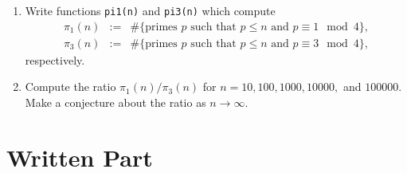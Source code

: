 \documentclass[11pt]{article}
\begin{document}
\begin{enumerate}
{\begin{enumerate}
{    }
    \item{
    Write functions \verb|pi1(n)| and \verb|pi3(n)| which compute
    \begin{eqnarray*}
      \pi_1(n)&:=&\#\{\text{primes }p\text{ such that }p\le n\text{ and }p\equiv 1\mod 4\},\\
      \pi_3(n)&:=&\#\{\text{primes }p\text{ such that }p\le n\text{ and }p\equiv 3\mod 4\},
    \end{eqnarray*}
    respectively.
    }
    \item{
    Compute the ratio $\pi_1(n)/\pi_3(n)$ for $n = 10,100,1000,10000,$ and $100000$.  Make a conjecture about the ratio as $n\to\infty$.
    }
  \end{enumerate}
  }
\end{enumerate}
\section*{Written Part}
\end{document}
